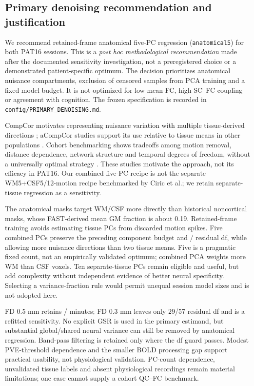 \documentclass[11pt,a4paper]{article}
\begin{document}
\subsection{Primary denoising recommendation and justification}
We recommend retained-frame anatomical five-PC regression (\texttt{anatomical5}) for both PAT16 sessions. This is a \emph{post hoc methodological recommendation} made after the documented sensitivity investigation, not a preregistered choice or a demonstrated patient-specific optimum. The decision prioritizes anatomical nuisance compartments, exclusion of censored samples from PCA training and a fixed model budget. It is not optimized for low mean FC, high SC--FC coupling or agreement with cognition. The frozen specification is recorded in \texttt{config/PRIMARY\_DENOISING.md}.

CompCor motivates representing nuisance variation with multiple tissue-derived directions \citep{behzadi2007}; aCompCor studies support its use relative to tissue means in other populations \citep{muschelli2014}. Cohort benchmarking shows tradeoffs among motion removal, distance dependence, network structure and temporal degrees of freedom, without a universally optimal strategy \citep{ciric2017}. These studies motivate the approach, not its efficacy in PAT16. Our combined five-PC recipe is not the separate WM5+CSF5/12-motion recipe benchmarked by Ciric et al.; we retain separate-tissue regression as a sensitivity.

The anatomical masks target WM/CSF more directly than historical noncortical masks, whose FAST-derived mean GM fraction is about 0.19. Retained-frame training avoids estimating tissue PCs from discarded motion spikes. Five combined PCs preserve the preceding component budget and \PreDof{}/\PostDof{} residual df, while allowing more nuisance directions than two tissue means. Five is a pragmatic fixed count, not an empirically validated optimum; combined PCA weights more WM than CSF voxels. Ten separate-tissue PCs remain eligible and useful, but add complexity without independent evidence of better neural specificity. Selecting a variance-fraction rule would permit unequal session model sizes and is not adopted here.

FD 0.5 mm retains \PreMinutes{}/\PostMinutes{} minutes; FD 0.3 mm leaves only 29/57 residual df and is a refitted sensitivity. No explicit GSR is used in the primary estimand, but substantial global/shared neural variance can still be removed by anatomical regression. Band-pass filtering is retained only where the df guard passes. Modest PVE-threshold dependence and the smaller BOLD processing gap support practical usability, not physiological validation. PC-count dependence, unvalidated tissue labels and absent physiological recordings remain material limitations; one case cannot supply a cohort QC--FC benchmark.
\end{document}
